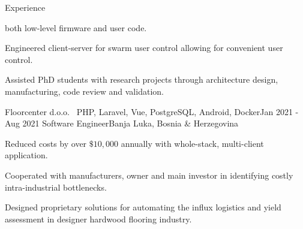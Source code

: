 \documentclass{resume}
\begin{document}
\begin{rSection}{Experience}
\begin{rSubsection}
            both low-level firmware and user code.
        \item Engineered client-server
            \underline{} for swarm user control allowing for convenient
            user control.
        \item Assisted PhD students with research projects through
            architecture design, manufacturing, code review and validation.
    \end{rSubsection}
    \begin{rSubsection}
        {Floorcenter d.o.o. \mid\ \textnormal{PHP, Laravel, Vue, PostgreSQL,
        Android, Docker}}{Jan 2021 - Aug 2021}
        {Software Engineer}{Banja Luka, Bosnia \& Herzegovina}
        \item Reduced costs by over $\$10,000$ annually with whole-stack,
            multi-client application.
        \item Cooperated with manufacturers, owner and main investor in
            identifying costly intra-industrial bottlenecks.
        \item Designed proprietary solutions for automating the influx logistics
            and yield assessment in designer hardwood flooring industry.
    \end{rSubsection}
\end{rSection}
\end{document}
